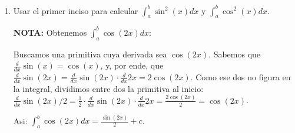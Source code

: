 \documentclass[12pt]{article}
\begin{document}
\begin{enumerate}[\hspace{9px} a)]
        Como, por hip\'otesis, \(0 \leq t \leq \displaystyle\frac{\pi}{2}\), \(0\leq\displaystyle\frac{t}{2}<\frac{\pi}{4}\). Por lo que \(1\geq\cos(t)\geq0\) y \(\displaystyle\frac{1+\cos(2t)}{2}>0\) por lo que podemos sacar ra\'iz cuadrada a ambos lados, asi:
        \[\cos\left(\displaystyle\frac{t}{2}\right)=\sqrt{\frac{1+\cos(t)}{2}}\]

        NOTA: Aunque la ra\'z denota un $\pm$, como ya especificamos que, dado el intervalo, $\cos(x)$ es mayor a 0, podemos dar por especificado el signo positivo. El caso ser\'a el mismo para $\sin(x)$.\bigskip

        Ahora con seno: \(\sin^2(x) = \frac{1-\cos(2x)}{2}\)\bigskip

        Proponemos un cambio de variable tal que \(t=2x\), con lo que tenemos:
        \[\sin^2(x) = \frac{1-\cos(2x)}{2} \Longrightarrow \sin^2\left(\displaystyle\frac{t}{2}\right)=\frac{1-\cos(t)}{2}\]

        Como, por hip\'otesis, \(0 \leq t \leq \displaystyle\frac{\pi}{2}\), \(0\leq\displaystyle\frac{t}{2}<\frac{\pi}{4}\). Por lo que \(0\leq\sin(t)\leq1\) y \(\frac{1-\cos(2t)}{2}>0\) (por que \(1=\cos(0)\leq\cos(2t)\leq\cos(\pi)=-1 \Longrightarrow 1-\cos(2t)>0\) por lo que podemos sacar ra\'iz cuadrada a ambos lados, asi:
        \[\sin\left(\displaystyle\frac{t}{2}\right)=\sqrt{\frac{1-\cos(t)}{2}}\]

    \item Usar el primer inciso para calcular \(\displaystyle\int_{a}^{b}\sin^2(x)dx\) y \(\displaystyle\int_{a}^{b}\cos^2(x)dx\).
    
        \textbf{NOTA:} Obtenemos \(\displaystyle\int_{a}^{b}\cos(2x)dx\):\medskip

        Buscamos una primitiva cuya derivada sea $\cos(2x)$. Sabemos que \(\displaystyle\frac{d}{dx}\sin(x)=\cos(x)\), y, por ende, que \(\displaystyle\frac{d}{dx}\sin(2x)=\frac{d}{dx}\sin(2x)\cdot \frac{d}{dx}2x = 2\cos(2x)\). Como ese dos no figura en la integral, dividimos entre dos la primitiva al inicio: \(\displaystyle\frac{d}{dx}\sin(2x)/2=\frac{1}{2}\cdot\frac{d}{dx}\sin(2x)\cdot \frac{d}{dx}2x = \frac{2\cos(2x)}{2} = \cos(2x)\).\bigskip

        Asi: \quad \(\displaystyle\int_{a}^{b}\cos(2x)dx = \frac{\sin(2x)}{2}+c\).\bigskip


\end{enumerate}
\end{document}
